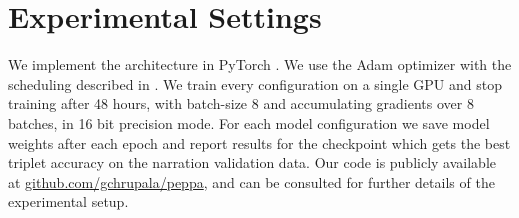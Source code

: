 \section{Experimental Settings}
We implement the architecture in PyTorch \citep{NEURIPS2019_9015}. We
use the Adam optimizer \citep{kingma2014adam} with the scheduling
described in \citep{devlin-etal-2019-bert}. We train every
configuration on a single GPU and stop training after 48 hours, with
batch-size 8 and accumulating gradients over 8 batches, in 16 bit
precision mode. For each model configuration we save model weights
after each epoch and report results for the checkpoint which gets the
best triplet accuracy on the narration validation data.
Our code is publicly available at \url{github.com/gchrupala/peppa},
and can be consulted for further details of the experimental setup.
